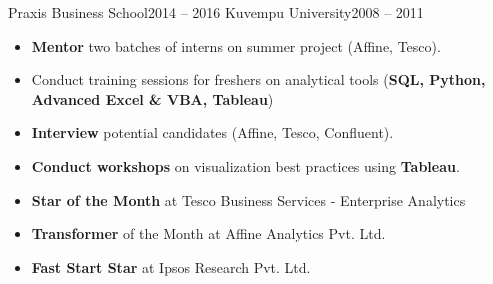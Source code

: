  {Praxis Business School}{2014 -- 2016} {}
 {Kuvempu University}{2008 -- 2011} {}


\medskip
{}

\medskip
{}

\medskip
{}

\medskip
{}





\begin{itemize}
  \item \textbf{Mentor} two batches of interns on summer project (Affine, Tesco).
  \item Conduct training sessions for freshers on analytical tools (\textbf{SQL, Python, Advanced Excel \& VBA, Tableau})
  \item \textbf{Interview} potential candidates (Affine, Tesco, Confluent).
  \item \textbf{Conduct workshops} on visualization best practices using \textbf{Tableau}.
\end{itemize}

\begin{itemize}
  \item \textbf{Star of the Month} at Tesco Business Services - Enterprise Analytics
  \item \textbf{Transformer} of the Month at Affine Analytics Pvt. Ltd.
  \item \textbf{Fast Start Star} at Ipsos Research Pvt. Ltd.
\end{itemize}

{}
{}
